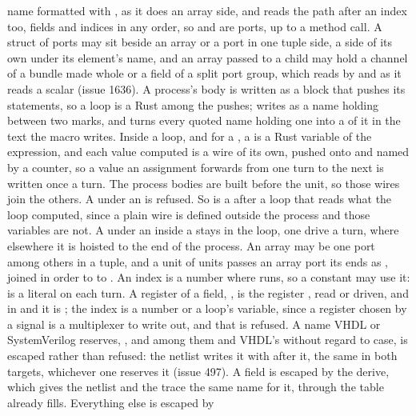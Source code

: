 name formatted with , as it does an array side, and reads
the path after an index too, fields and indices in any order, so
 and  are ports, up to
a method call. A struct of ports may sit beside an array or a port in one
tuple side, a side of its own under its element's name, and an array
passed to a child may hold a channel of a bundle made whole or a field
of a split port group, which  reads by
 and  as it reads a scalar
(issue 1636). A process's body is written as a block that pushes its
statements, so a loop is a Rust  among the pushes;
 writes  as a name holding 
between two marks, and  turns every quoted name
holding one into a  of it in the text the macro writes.
Inside a loop, and for a , a  is a Rust
variable of the expression, and each value computed is a wire of its
own, pushed onto  and named  by a counter,
so a value an assignment forwards from one turn to the next is written
once a turn. The process bodies are built before the unit, so those
wires join the others. A  under an  is refused.
So is a  after a loop that reads what the loop computed,
since a plain wire is defined outside the process and those variables
are not. A  under an  inside a  stays in
the loop, one drive a turn, where elsewhere it is hoisted to the end
of the process. An array may be one port among others in a tuple,
and a unit of units passes an array port its ends as
\code{[a, b, c]}, joined in order to  to . An
index is a number where  runs, so a constant may use
it:  is a literal on each turn.
A register of a  field, , is the
register , read or driven, and in  and
 it is ; the index is a number or a
loop's variable, since a register chosen by a signal is a
multiplexer to write out, and that is refused.
A name VHDL or SystemVerilog reserves, ,  and
 among them and VHDL's without regard to case, is
escaped rather than refused: the netlist writes it with 
after it, the same in both targets, whichever one reserves it (issue
497). A field is escaped by the  derive, which gives the
netlist and the trace the same name for it, through the table
\code{\#[rename]} already fills. Everything else is escaped by
